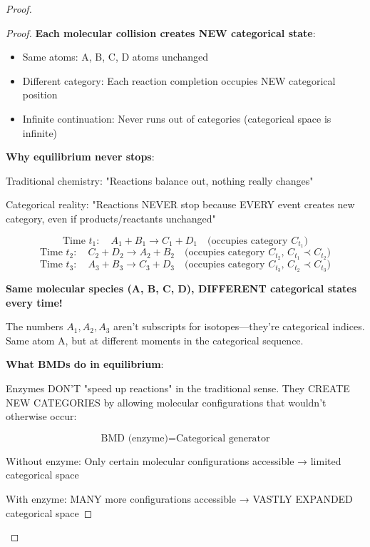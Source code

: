 \documentclass[11pt,a4paper]{article}
\begin{document}
\begin{proof}
\begin{proof}
\textbf{Each molecular collision creates NEW categorical state}:
\begin{itemize}
\item Same atoms: A, B, C, D atoms unchanged
\item Different category: Each reaction completion occupies NEW categorical position
\item Infinite continuation: Never runs out of categories (categorical space is infinite)
\end{itemize}

\textbf{Why equilibrium never stops}:

Traditional chemistry: "Reactions balance out, nothing really changes"

Categorical reality: "Reactions NEVER stop because EVERY event creates new category, even if products/reactants unchanged"

\begin{equation}
\text{Time } t_1: \quad A_1 + B_1 \to C_1 + D_1 \quad \text{(occupies category } C_{t_1}\text{)}
\end{equation}
\begin{equation}
\text{Time } t_2: \quad C_2 + D_2 \to A_2 + B_2 \quad \text{(occupies category } C_{t_2}\text{, } C_{t_1} \prec C_{t_2}\text{)}
\end{equation}
\begin{equation}
\text{Time } t_3: \quad A_3 + B_3 \to C_3 + D_3 \quad \text{(occupies category } C_{t_3}\text{, } C_{t_2} \prec C_{t_3}\text{)}
\end{equation}

\textbf{Same molecular species (A, B, C, D), DIFFERENT categorical states every time!}

The numbers $A_1, A_2, A_3$ aren't subscripts for isotopes—they're categorical indices. Same atom A, but at different moments in the categorical sequence.

\textbf{What BMDs do in equilibrium}:

Enzymes DON'T "speed up reactions" in the traditional sense. They CREATE NEW CATEGORIES by allowing molecular configurations that wouldn't otherwise occur:

\begin{equation}
\text{BMD (enzyme)} = \text{Categorical generator}
\end{equation}

Without enzyme: Only certain molecular configurations accessible → limited categorical space

With enzyme: MANY more configurations accessible → VASTLY EXPANDED categorical space


\end{proof}
\end{proof}
\end{document}

